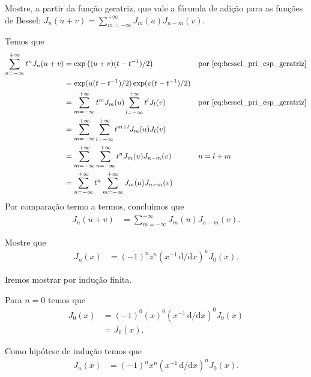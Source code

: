 \documentclass[a4paper,12pt, leqno, answers]{exam}
\begin{document}
\begin{questions}
     Mostre, a partir da fun\c{c}\~{a}o geratriz, que vale a f\'{o}rumla de adi\c{c}\~{a}o para as fun\c{c}\~{o}es de Bessel: $J_n(u + v) = \sum_{m = -\infty}^{+\infty} J_m(u) J_{n - m}(v)$.
    \begin{solution}
        Temos que
        \begin{align*}
            \sum_{n = -\infty}^{+\infty} t^n J_n(u + v) &= \exp\left( (u + v)(t - t^{-1})/2 \right) && \text{por \eqref{eq:bessel_pri_esp_geratriz}} \\
            &=\exp(u(t - t^{-1})/2) \exp(v(t - t^{-1})/2) \\
            &= \sum_{m = -\infty}^{+\infty} t^m J_m(u) \sum_{l = -\infty}^{+\infty} t^l J_l(v) && \text{por \eqref{eq:bessel_pri_esp_geratriz}} \\
            &= \sum_{m = -\infty}^{+\infty} \sum_{l = -\infty}^{+\infty} t^{m + l} J_m(u) J_l(v) \\
            &= \sum_{m = -\infty}^{+\infty} \sum_{n = -\infty}^{+\infty} t^{n} J_m(u) J_{n - m}(v) && n = l + m  \\
            &= \sum_{n = -\infty}^{+\infty} t^{n} \sum_{m = -\infty}^{+\infty} J_m(u) J_{n - m}(v)
        \end{align*}
        Por compara\c{c}\~{a}o termo a termos, concluimos que
        \begin{align*}
            J_n(u + v) &= \sum_{m = - \infty}^{+\infty} J_m(u) J_{n - m}(v).
        \end{align*}
    \end{solution}

     Mostre que
    \begin{align*}
        J_n(x) &= (-1)^n z^n \left( x^{-1} \,\mathrm{d}/\mathrm{d}x \right)^n J_0(x).
    \end{align*}
    \begin{solution}
        Iremos mostrar por indu\c{c}\~{a}o finita.

        Para $n = 0$ temos que
        \begin{align*}
            J_0(x) &= (-1)^0 (x)^0 \left( x^{-1} \,\mathrm{d}/\mathrm{d}x \right)^0 J_0(x) \\
            &= J_0(x).
        \end{align*}

        Como hip\'{o}tese de indu\c{c}\~{a}o temos que
        \begin{align*}
            J_n(x) &= (-1)^n x^n \left( x^{-1} \,\mathrm{d}/\mathrm{d}x \right)^n J_0(x).
        \end{align*}


\end{solution}
\end{questions}
\end{document}
